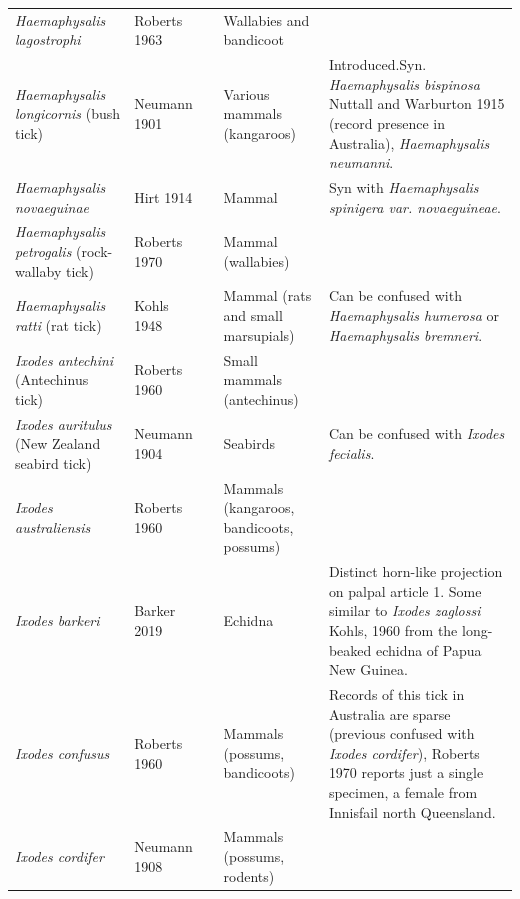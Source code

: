 \documentclass[a4paper, nobind]{templates/ociamthesis}
\begin{document}
\begin{landscape}
\begin{longtable}[t]{>{\raggedright\arraybackslash}p{4cm}>{\raggedright\arraybackslash}p{3cm}>{\raggedright\arraybackslash}p{1cm}>{\raggedright\arraybackslash}p{4cm}>{\raggedright\arraybackslash}p{6cm}}
\textit{Haemaphysalis lagostrophi} & Roberts 1963 & \multicolumn{1}{c}{\cellcolor[HTML]{BEBADA}{\textcolor{white}{N}}} & Wallabies and bandicoot & \\
\textit{Haemaphysalis longicornis} (bush tick) & Neumann 1901 & \multicolumn{1}{c}{\cellcolor[HTML]{8DD3C7}{\textcolor{white}{Y}}} & Various mammals (kangaroos) & Introduced.Syn. \textit{Haemaphysalis bispinosa} Nuttall and Warburton 1915 (record presence in Australia),  \textit{Haemaphysalis neumanni}.\\
\textit{Haemaphysalis novaeguinae} & Hirt 1914 & \multicolumn{1}{c}{\cellcolor[HTML]{8DD3C7}{\textcolor{white}{Y}}} & Mammal & Syn with \textit{Haemaphysalis  spinigera var. novaeguineae}.\\
\textit{Haemaphysalis petrogalis} (rock-wallaby tick) & Roberts 1970 & \multicolumn{1}{c}{\cellcolor[HTML]{BEBADA}{\textcolor{white}{N}}} & Mammal (wallabies) & \\
\textit{Haemaphysalis ratti} (rat tick) & Kohls 1948 & \multicolumn{1}{c}{\cellcolor[HTML]{BEBADA}{\textcolor{white}{N}}} & Mammal (rats and small marsupials) & Can be confused with \textit{Haemaphysalis humerosa} or \textit{Haemaphysalis bremneri}.\\
\textit{Ixodes antechini} (Antechinus tick) & Roberts 1960 & \multicolumn{1}{c}{\cellcolor[HTML]{BEBADA}{\textcolor{white}{N}}} & Small mammals (antechinus) & \\
\textit{Ixodes auritulus} (New Zealand seabird tick) & Neumann 1904 & \multicolumn{1}{c}{\cellcolor[HTML]{BEBADA}{\textcolor{white}{N}}} & Seabirds & Can be confused with \textit{Ixodes fecialis}.\\
\textit{Ixodes australiensis} & Roberts 1960 & \multicolumn{1}{c}{\cellcolor[HTML]{8DD3C7}{\textcolor{white}{Y}}} & Mammals (kangaroos, bandicoots, possums) & \\
\textit{Ixodes barkeri} & Barker 2019 & \multicolumn{1}{c}{\cellcolor[HTML]{BEBADA}{\textcolor{white}{N}}} & Echidna & Distinct horn-like projection on palpal article 1. Some similar to \textit{Ixodes zaglossi} Kohls, 1960 from the long-beaked echidna of Papua New Guinea.\\
\textit{Ixodes confusus} & Roberts 1960 & \multicolumn{1}{c}{\cellcolor[HTML]{8DD3C7}{\textcolor{white}{Y}}} & Mammals (possums, bandicoots) & Records of this tick in Australia are sparse (previous confused with \textit{Ixodes cordifer}), Roberts 1970 reports just a single specimen, a female from Innisfail north Queensland.\\
\textit{Ixodes cordifer} & Neumann 1908 & \multicolumn{1}{c}{\cellcolor[HTML]{BEBADA}{\textcolor{white}{N}}} & Mammals (possums, rodents) & \\

\end{longtable}
\end{landscape}
\end{document}
